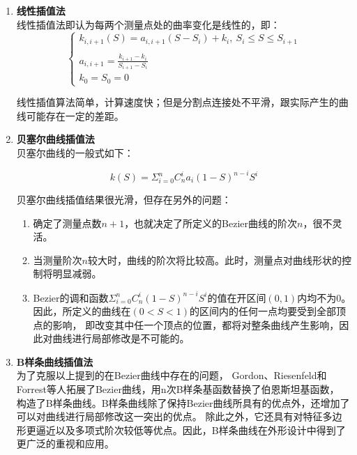 \begin{enumerate}[label=(\Alph*)]
    \item \textbf{线性插值法} \\
    线性插值法即认为每两个测量点处的曲率变化是线性的，即：
    \begin{equation}
    \left\{
        \begin{array}{lr}
        k_{i, i+1} (S) = a_{i, i+1} (S - S_i) + k_i, \ S_i\leq S\leq S_{i+1}\\
    \\
        a_{i, i+1} = \frac{k_{i+1} - k_i}{S_{i+1} - S_i}
    \\
        k_0 = S_0 = 0
        \end{array}
    \right.
    \end{equation}

    线性插值算法简单，计算速度快；但是分割点连接处不平滑，跟实际产生的曲线可能存在一定的差距。

    \item \textbf{贝塞尔曲线插值法} \\
    贝塞尔曲线的一般式如下：

    \begin{equation}
        k(S) = \Sigma_{i=0}^nC_n ^ i a_i(1-S)^{n - i}S^i
    \end{equation}

    贝塞尔曲线插值结果很光滑，但存在另外的问题：

    \begin{enumerate}[label=(\alph*)]
        \item 确定了测量点数$n+1$，也就决定了所定义的Bezier曲线的阶次$n$，很不灵活。
        \item 当测量阶次$n$较大时，曲线的阶次将比较高。此时，测量点对曲线形状的控制将明显减弱。
        \item Bezier的调和函数$\Sigma_{i=0}^nC_n ^ i (1-S)^{n - i}S^i$的值在开区间$(0,1)$内均不为0。
        因此，所定义的曲线在$(0<S<1)$的区间内的任何一点均要受到全部顶点的影响，
        即改变其中任一个顶点的位置，都将对整条曲线产生影响，因此对曲线进行局部修改是不可能的。
    \end{enumerate}

    \item \textbf{B样条曲线插值法} \\
    为了克服以上提到的在Bezier曲线中存在的问题，
    Gordon、Riesenfeld和Forrest等人拓展了Bezier曲线，用n次B样条基函数替换了伯恩斯坦基函数，
    构造了B样条曲线。B样条曲线除了保持Bezier曲线所具有的优点外，还增加了可以对曲线进行局部修改这一突出的优点。
    除此之外，它还具有对特征多边形更逼近以及多项式阶次较低等优点。因此，B样条曲线在外形设计中得到了更广泛的重视和应用。


\end{enumerate}
